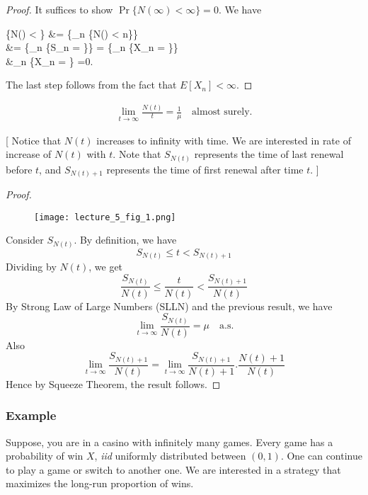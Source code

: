 \documentclass[a4paper,10pt, english]{article}
\begin{document}
\begin{proof}
	It suffices to show $\Pr\{N(\infty) < \infty\} = 0$. We have
	\begin{flalign*}
	\Pr\{N(\infty) < \infty\} &= \Pr\{\bigcup_{n \in {}} \{N(\infty) < n\}\}\\
	&= \Pr\{\bigcup_{n \in {}} \{S_n = \infty\}\} = \Pr\{\bigcup_{n \in {}} \{X_n = \infty\}\} \\
	&\leq \sum_{n \in {}}\Pr\{X_n = \infty\} =0.
	\end{flalign*}
	The last step follows from the fact that $E[X_n] < \infty$.
\end{proof}
\begin{thm}
	
	
	\begin{align*}
	\lim_{t \to \infty} \frac{N(t)}{t} = \frac{1}{\mu} \quad \mbox{almost surely}.
	\end{align*}
\end{thm}
[
Notice that $N(t)$ increases to infinity with time. We are interested in rate of increase of $N(t)$ with $t$. Note that $S_{N(t)}$ represents the time of last renewal before $t$, and $S_{N(t)+1}$ represents the time of first renewal after time $t$. ] \\

\begin{proof}
	\begin{figure}
		\texttt{[image: lecture\_5\_fig\_1.png]}
	\end{figure}
	Consider $S_{N(t)}$. By definition, we have
	\[S_{N(t)} \leq t < S_{N(t)+1}\]
	Dividing by $N(t)$, we get 
	\[\frac{S_{N(t)}}{N(t)} \leq \frac{t}{N(t)} < \frac{S_{N(t)+1}}{N(t)}\]
	By Strong Law of Large Numbers (SLLN) and the previous result, we have
	\[\lim_{t \to \infty}\frac{S_{N(t)}}{N(t)} = \mu \quad \mbox{a.s.}\] 
	Also
	\[\lim_{t \to \infty} \frac{S_{N(t)+1}}{N(t)} = \lim_{t \to \infty} \frac{S_{N(t)+1}}{N(t)+1}.\frac{N(t)+1}{N(t)} \]
	Hence by Squeeze Theorem, the result follows.
\end{proof}


\subsubsection{Example}
Suppose, you are in a casino with infinitely many games. Every game has a probability of win $X$, \emph{iid} uniformly distributed between $(0,1)$. One can continue to play a game or switch to another one. We are interested in a strategy that maximizes the long-run proportion of wins.
\end{document}
